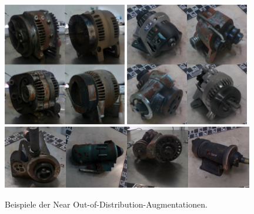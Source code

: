 \begin{figure}[h]
  \centering
  \includegraphics[width=0.48\textwidth]{images/figure_results_ood-augs_good_1.png}%
  \hspace{0.02\textwidth}\includegraphics[width=0.48\textwidth]{images/figure_results_ood-augs_good_3.png}\vspace{0.01\textwidth}
  \includegraphics[width=0.98\textwidth]{figure_results_ood-augs_good_4.png}
  \caption{Beispiele der Near Out-of-Distribution-Augmentationen.}
  \label{fig:ood-augs-good}
\end{figure}

